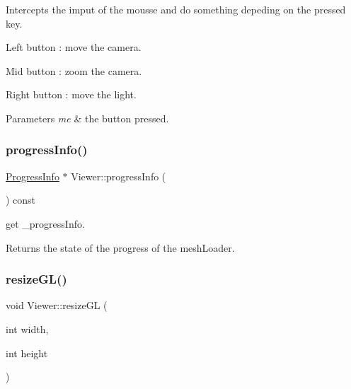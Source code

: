 Intercepts the imput of the mousse and do something depeding on the pressed key. 


\begin{DoxyItemize}
\item Left button \+: move the camera.
\begin{DoxyItemize}
\item Mid button \+: zoom the camera.
\item Right button \+: move the light. 
\begin{DoxyParams}{Parameters}
{\em me} & the button pressed. \\
\hline
\end{DoxyParams}

\end{DoxyItemize}
\end{DoxyItemize}\mbox{\label{class_viewer_a7990e46887a50148c6dda326484c1996}} 
\subsubsection{\texorpdfstring{progress\+Info()}{progressInfo()}}
{\footnotesize\ttfamily \mbox{\hyperlink{class_progress_info}{Progress\+Info}} $\ast$ Viewer\+::progress\+Info (\begin{DoxyParamCaption}{ }\end{DoxyParamCaption}) const}



get \+\_\+progress\+Info. 

\begin{DoxyReturn}{Returns}
the state of the progress of the mesh\+Loader. 
\end{DoxyReturn}
\mbox{\label{class_viewer_a03c6a6d6c43c9fbcc26d11cb944d4875}} 
\subsubsection{\texorpdfstring{resize\+G\+L()}{resizeGL()}}
{\footnotesize\ttfamily void Viewer\+::resize\+GL (\begin{DoxyParamCaption}\item[{int}]{width,  }\item[{int}]{height }\end{DoxyParamCaption})\hspace{0.3cm}{\ttfamily [virtual]}}




